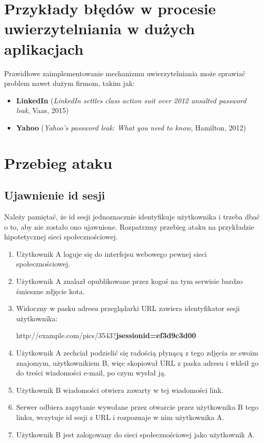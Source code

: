 \documentclass[12pt,polish,a4paper,]{report}
\providecommand{\tightlist}{%
  \setlength{\itemsep}{0pt}\setlength{\parskip}{0pt}}
\begin{document}
\section{Przykłady błędów w procesie uwierzytelniania w dużych
aplikacjach}\label{przykux142ady-bux142ux119duxf3w-w-procesie-uwierzytelniania-w-duux17cych-aplikacjach}

Prawidłowe zaimplementowanie mechanizmu uwierzytelniania może sprawiać
problem nawet dużym firmom, takim jak:

\begin{itemize}
\tightlist
\item
  \textbf{LinkedIn} (\emph{LinkedIn settles class action suit over 2012
  unsalted password leak}, Vaas, 2015)
\item
  \textbf{Yahoo} (\emph{Yahoo's password leak: What you need to know},
  Hamilton, 2012)
\end{itemize}

\section{Przebieg ataku}\label{przebieg-ataku-1}

\subsection{Ujawnienie id sesji}\label{ujawnienie-id-sesji}

Należy pamiętać, że id sesji jednoznacznie identyfikuje użytkownika i
trzeba dbać o to, aby nie zostało ono ujawnione. Rozpatrzmy przebieg
ataku na przykładzie hipotetycznej sieci społecznościowej.

\begin{enumerate}
\def\labelenumi{\arabic{enumi}.}
\item
  Użytkownik A loguje się do interfejsu webowego pewnej sieci
  społecznościowej.
\item
  Użytkownik A znalazł opublikowane przez kogoś na tym serwisie bardzo
  śmieszne zdjęcie kota.
\item
  Widoczny w pasku adresu przeglądarki URL zawiera identyfikator sesji
  użytkownika:

  http://example.com/pics/3543?\textbf{jsessionid=ef3d9c3d00}
\item
  Użytkownik A zechciał podzielić się radością płynącą z tego zdjęcia ze
  swoim znajomym, użytkownikiem B, więc skopiował URL z paska adresu i
  wkleił go do treści wiadomości e-mail, po czym wysłał ją.
\item
  Użytkownik B wiadomości otwiera zawarty w tej wiadomości link.
\item
  Serwer odbiera zapytanie wywołane przez otwarcie przez użytkownika B
  tego linku, wczytuje id sesji z URL i rozpoznaje w nim użytkownika A.
\item
  Użytkownik B jest zalogowany do sieci społecznościowej jako użytkownik
  A.
\end{enumerate}
\end{document}
